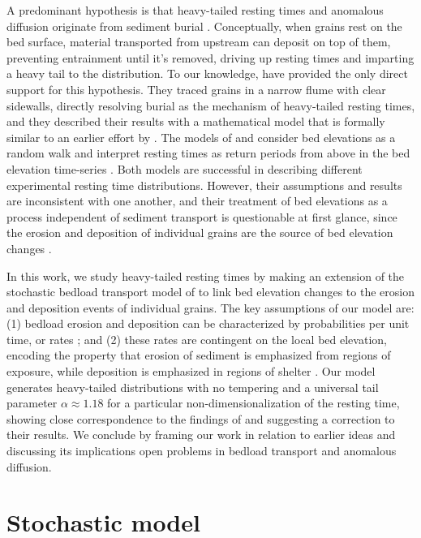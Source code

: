 \documentclass[draft]{agujournal2018}
\begin{document}
A predominant hypothesis is that heavy-tailed resting times and anomalous diffusion originate from sediment burial \citep{Voepel2013,Martin2014, Wu2019}.
Conceptually, when grains rest on the bed surface, material transported from upstream can deposit on top of them, preventing entrainment until it's removed, driving up resting times and imparting a heavy tail to the distribution.
To our knowledge, \citet{Martin2014} have provided the only direct support for this hypothesis.
They traced grains in a narrow flume with clear sidewalls, directly resolving burial as the mechanism of heavy-tailed resting times, and they described their results with a mathematical model that is formally similar to an earlier effort by \citet{Voepel2013}.
The models of \citet{Voepel2013} and \citet{Martin2014} consider bed elevations as a random walk and interpret resting times as return periods from above in the bed elevation time-series \citep[e.g.,][]{Redner2007}.
Both models are successful in describing different experimental resting time distributions.
However, their assumptions and results are inconsistent with one another, and their treatment of bed elevations as a process independent of sediment transport is questionable at first glance, since the erosion and deposition of individual grains are the source of bed elevation changes \citep[e.g.,][]{Wong2007}.

In this work, we study heavy-tailed resting times by making an extension of the stochastic bedload transport model of \citet{Ancey2008} to link bed elevation changes to the erosion and deposition events of individual grains.
The key assumptions of our model are: (1) bedload erosion and deposition can be characterized by probabilities per unit time, or rates \citep[e.g.,][]{Einstein1950, Ancey2008}; and (2) these rates are contingent on the local bed elevation, encoding the property that erosion of sediment is emphasized from regions of exposure, while deposition is emphasized in regions of shelter \citep[e.g.,][]{Sawai1987, Wong2007}.
Our model generates heavy-tailed distributions with no tempering and a universal tail parameter $\alpha \approx 1.18$ for a particular non-dimensionalization of the resting time, showing close correspondence to the findings of \citet{Martin2014} and suggesting a correction to their results.
We conclude by framing our work in relation to earlier ideas and discussing its implications open problems in bedload transport and anomalous diffusion.

\section{Stochastic model}
\label{sec:model}
\end{document}
